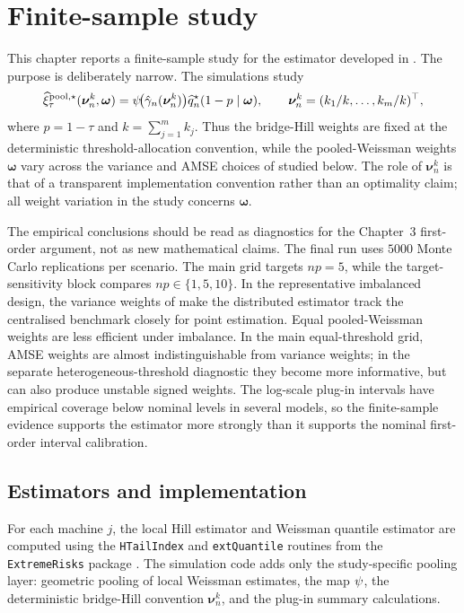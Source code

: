 \chapter{Finite-sample study}
\label{ch:finite-sample}

This chapter reports a finite-sample study for the estimator developed in
. The purpose is deliberately narrow. The simulations
study
\[
  \widehat\xi_{\tau}^{\mathrm{pool},\star}
    (\bm\nu_n^k,\bm\omega)
  =
  \psi\!\big(\hat\gamma_n(\bm\nu_n^k)\big)
  \widehat{q}^{\star}_n(1-p\mid\bm\omega),
  \qquad
  \bm\nu_n^k=(k_1/k,\ldots,k_m/k)^\top,
\]
where \(p=1-\tau\) and \(k=\sum_{j=1}^{m}k_j\). Thus the bridge-Hill weights
are fixed at the deterministic threshold-allocation convention, while the
pooled-Weissman weights \(\bm\omega\) vary across the variance and AMSE
choices of \textcite{DaouiaPadoanStupfler2021} studied below. The role of
\(\bm\nu_n^k\) is that of a transparent implementation convention rather than
an optimality claim; all weight variation in the study concerns \(\bm\omega\).

The empirical conclusions should be read as diagnostics for the Chapter~3
first-order argument, not as new mathematical claims. The final run uses
\(5000\) Monte Carlo replications per scenario. The main grid targets
\(np=5\), while the target-sensitivity block compares \(np\in\{1,5,10\}\).
In the representative
imbalanced design, the variance weights of
\textcite{DaouiaPadoanStupfler2021} make the distributed estimator track the
centralised benchmark closely for point estimation. Equal pooled-Weissman
weights are less efficient under imbalance.
In the main equal-threshold grid, AMSE weights are almost indistinguishable
from variance weights; in the separate heterogeneous-threshold diagnostic they
become more informative, but can also produce unstable signed weights. The
log-scale plug-in intervals have empirical coverage below nominal levels in
several models, so the finite-sample evidence supports the estimator more
strongly than it supports the nominal first-order interval calibration.

\section{Estimators and implementation}
\label{sec:sim:estimators}

For each machine \(j\), the local Hill estimator and Weissman quantile
estimator are computed using the \texttt{HTailIndex} and \texttt{extQuantile}
routines from the \texttt{ExtremeRisks} package \parencite{ExtremeRisksR}.
The simulation code adds only the study-specific pooling layer: geometric
pooling of local Weissman estimates, the map \(\psi\), the deterministic
bridge-Hill convention \(\bm\nu_n^k\), and the plug-in summary calculations.

